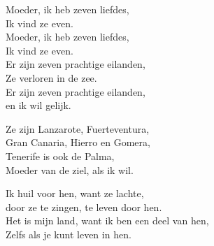 \clearpage
\begin{translation}
Moeder, ik heb zeven liefdes,\\
Ik vind ze even.\\
Moeder, ik heb zeven liefdes,\\
Ik vind ze even.\\
Er zijn zeven prachtige eilanden,\\
Ze verloren in de zee.\\
Er zijn zeven prachtige eilanden,\\
en ik wil gelijk.\vspace{\wlskip}

Ze zijn Lanzarote, Fuerteventura,\\
Gran Canaria, Hierro en Gomera,\\
Tenerife is ook de Palma,\\
Moeder van de ziel, als ik wil.\vspace{\wlskip}

Ik huil voor hen, want ze lachte,\\
door ze te zingen, te leven door hen.\\
Het is mijn land, want ik ben een deel van hen,\\
Zelfs als je kunt leven in hen.
\end{translation}
